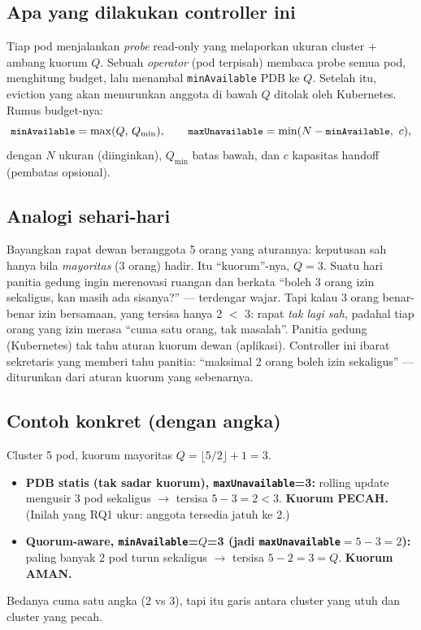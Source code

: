 \documentclass[11pt]{article}
\newcommand{\code}[1]{\texttt{\small #1}}
\begin{document}
\subsection{Apa yang dilakukan controller ini}
Tiap pod menjalankan \emph{probe} read-only yang melaporkan ukuran cluster + ambang kuorum $Q$. Sebuah
\emph{operator} (pod terpisah) membaca probe semua pod, menghitung budget, lalu menambal
\code{minAvailable} PDB ke $Q$. Setelah itu, eviction yang akan menurunkan anggota di bawah $Q$ ditolak
oleh Kubernetes. Rumus budget-nya:
\begin{equation}
\code{minAvailable} = \max(Q,\,Q_{\min}), \qquad
\code{maxUnavailable} = \min(N - \code{minAvailable},\ c),
\label{eq:budget}
\end{equation}
dengan $N$ ukuran (diinginkan), $Q_{\min}$ batas bawah, dan $c$ kapasitas handoff (pembatas opsional).

\subsection{Analogi sehari-hari}
Bayangkan rapat dewan beranggota 5 orang yang aturannya: keputusan sah hanya bila \emph{mayoritas}
(3 orang) hadir. Itu ``kuorum''-nya, $Q=3$. Suatu hari panitia gedung ingin merenovasi ruangan dan
berkata ``boleh 3 orang izin sekaligus, kan masih ada sisanya?'' --- terdengar wajar. Tapi kalau 3
orang benar-benar izin bersamaan, yang tersisa hanya 2 $<$ 3: rapat \emph{tak lagi sah}, padahal tiap
orang yang izin merasa ``cuma satu orang, tak masalah''. Panitia gedung (Kubernetes) tak tahu aturan
kuorum dewan (aplikasi). Controller ini ibarat sekretaris yang memberi tahu panitia: ``maksimal 2 orang
boleh izin sekaligus'' --- diturunkan dari aturan kuorum yang sebenarnya.

\subsection{Contoh konkret (dengan angka)}
\label{sec:contoh}
Cluster 5 pod, kuorum mayoritas $Q = \lfloor 5/2\rfloor + 1 = 3$.
\begin{itemize}[leftmargin=1.4em]
  \item \textbf{PDB statis (tak sadar kuorum), \code{maxUnavailable}=3:} rolling update mengusir 3 pod
        sekaligus $\rightarrow$ tersisa $5-3 = 2 < 3$. \textbf{Kuorum PECAH.} (Inilah yang RQ1 ukur:
        anggota tersedia jatuh ke 2.)
  \item \textbf{Quorum-aware, \code{minAvailable}=$Q$=3 (jadi \code{maxUnavailable}$=5-3=2$):} paling
        banyak 2 pod turun sekaligus $\rightarrow$ tersisa $5-2 = 3 = Q$. \textbf{Kuorum AMAN.}
\end{itemize}
Bedanya cuma satu angka (2 vs 3), tapi itu garis antara cluster yang utuh dan cluster yang pecah.
\end{document}
